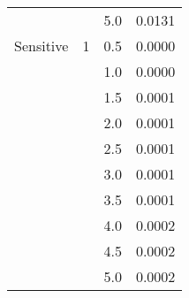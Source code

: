 \begin{tabular}{lllr}
          &     & 5.0 & 0.0131 \\
Sensitive & 1   & 0.5 & 0.0000 \\
          &     & 1.0 & 0.0000 \\
          &     & 1.5 & 0.0001 \\
          &     & 2.0 & 0.0001 \\
          &     & 2.5 & 0.0001 \\
          &     & 3.0 & 0.0001 \\
          &     & 3.5 & 0.0001 \\
          &     & 4.0 & 0.0002 \\
          &     & 4.5 & 0.0002 \\
          &     & 5.0 & 0.0002 \\
\bottomrule
\end{tabular}
